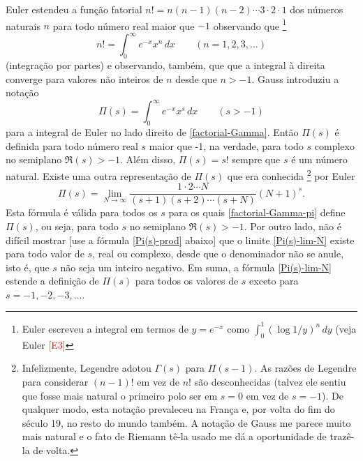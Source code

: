     
    Euler estendeu a função fatorial $n! = n(n-1)(n-2) \cdots 3 \cdot 2 \cdot 1$ dos números naturais $n$ para todo número real maior que $-1$ observando que 
    \footnote{Euler escreveu a integral em termos de $y = e^{-x}$ como $\int_{0}^{1}(\log 1/y)^n \, dy$ (veja Euler \textcolor{red}{[E3]}
    }
    \begin{equation}
        \label{factorial-Gamma}
        n! = \int_{0}^{\infty}e^{-x}x^n \, dx \qquad (n = 1, 2, 3, \dots)
    \end{equation}
    (integração por partes) e observando, também, que que a integral à direita converge para valores não inteiros de $n$ desde que $n>-1$. Gauss \cite{gauss1813circa} introduziu a notação
    \begin{equation}
        \label{factorial-Gamma-pi}
        \Pi(s) = \int_{0}^{\infty}e^{-x}x^s \, dx \qquad (s>-1)
    \end{equation}
    para a integral de Euler no lado direito de \eqref{factorial-Gamma}. Então $\Pi(s)$ é definida para todo número real $s$ maior que -1, na verdade, para todo $s$ complexo no semiplano $\Re(s)>-1$. Além disso, $\Pi(s) = s!$ sempre que $s$ é um número natural. Existe uma outra representação de $\Pi(s)$ que era conhecida
    \footnote{Infelizmente, Legendre adotou $\Gamma(s)$ para $\Pi(s-1)$. As razões de Legendre para considerar $(n-1)!$ em vez de $n!$ são desconhecidas (talvez ele sentiu que fosse mais natural o primeiro polo ser em $s=0$ em vez de $s=-1$). De qualquer modo, esta notação prevaleceu na França e, por volta do fim do século 19, no resto do mundo também. A notação de Gauss me parece muito mais natural e o fato de Riemann tê-la usado me dá a oportunidade de trazê-la de volta.
    }
    por Euler
    \begin{equation}
        \label{Pi(s)-lim-N}
        \Pi(s) = \lim_{N \to \infty} \frac{1 \cdot 2 \cdots N}{(s+1)(s+2)\cdots (s+N)}(N+1)^s.
    \end{equation}
    Esta fórmula é válida para todos os $s$ para os quais \eqref{factorial-Gamma-pi} define $\Pi(s)$, ou seja, para todo $s$ no semiplano $\Re(s)>-1$. Por outro lado, não é difícil mostrar [use a fórmula \eqref{Pi(s)-prod} abaixo] que o limite \eqref{Pi(s)-lim-N} existe para todo valor de $s$, real ou complexo, desde que o denominador não se anule, isto é, que $s$ não seja um inteiro negativo. Em suma, a fórmula \eqref{Pi(s)-lim-N} estende a definição de $\Pi(s)$ para todos os valores de $s$ exceto para $s = -1, -2, -3, \dots$.
    
